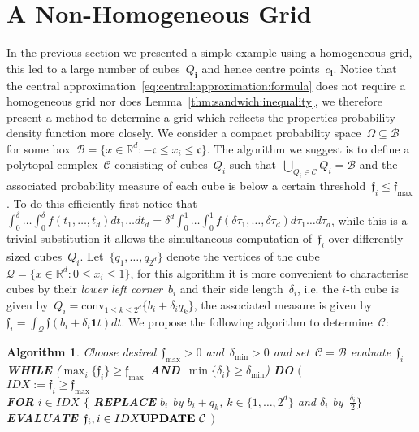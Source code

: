 \documentclass[letterpaper, 10pt, conference]{ieeeconf} %
\newtheorem{algo}[thm]{Algorithm}
\providecommand{\conv}{\text{conv}}
\providecommand{\bfa}[1]{\mathbf{#1}}
\begin{document}
\section{A Non-Homogeneous Grid}\label{sec:improved:grid}
%
%
%
\noindent In the previous section we presented a simple example using a homogeneous grid, this led to a large number of cubes~$Q_\bfa{i}$ and hence centre points~$c_\bfa{i}$.
%
Notice that the central approximation~\eqref{eq:central:approximation:formula} does not require a homogeneous grid nor does Lemma~\ref{thm:sandwich:inequality}, we therefore present a method to determine a grid which reflects the properties probability density function more closely.
%
We consider a compact probability space~$\Omega\subseteq\mathcal B$ for some box~$\mathcal B=\{x\in\mathbb R^d:-\mathfrak{c}\leq x_i\leq \mathfrak{c}\}$.
%
The algorithm we suggest is to define a polytopal complex~$\mathcal C$ consisting of cubes~$Q_i$ such that~$\bigcup_{Q_i\in\mathcal C}Q_i=\mathcal B$ and the associated probability measure of each cube is below a certain threshold~$\mathfrak{f}_i\leq\mathfrak{f}_{\max}$.
%
To do this efficiently first notice that~$\int_0^{\delta}\dots\int_0^\delta f(t_1,\dots,t_d)dt_1\dots dt_d = \delta^d\int_0^1\dots\int_0^1f(\delta\tau_1,\dots,\delta\tau_d)d\tau_1\dots d\tau_d$, while this is a trivial substitution it allows the simultaneous computation of~$\mathfrak{f}_i$ over differently sized cubes~$Q_i$.
%
Let~$\{q_1,\dots,q_{2^d}\}$ denote the vertices of the cube~$\mathcal Q=\{x\in\mathbb R^d: 0\leq x_i\leq 1\}$, for this algorithm it is more convenient to characterise cubes by their \emph{lower left corner}~$b_i$ and their side length~$\delta_i$, i.e. the $i$-th cube is given by~$Q_i=\conv_{1\leq k\leq2^d}\{b_i+\delta_i q_k\}$, the associated measure is given by~$\mathfrak{f}_i=\int_{\mathcal Q}\mathfrak{f}(b_i+\delta_i\bfa{1} t)dt$.
%
We propose the following algorithm to determine~$\mathcal C$:
%
\begin{algo}\label{algo:non:homo:cubes}
Choose desired~$\mathfrak{f}_{\max}>0$ and~$\delta_{\min}>0$ and set~$\mathcal C=\mathcal B$ evaluate~$\mathfrak{f}_i$\\
\textbf{WHILE} ($\max_i\{\mathfrak{f}_i\}\geq\mathfrak{f}_{\max}$~\textbf{AND}~$\min\{\delta_i\}\geq\delta_{\min}$) \textbf{DO} $\bigl($\\
$IDX := \mathfrak{f}_i\geq \mathfrak{f}_{\max}$\\
\textbf{FOR} $i\in IDX$ $\{$ \textbf{REPLACE} $b_i$ by $b_i+q_k$, $k\in\{1,\dots,2^d\}$ 
and $\delta_i$ by~$\frac{\delta_i}{2}\}$\\
\textbf{EVALUATE}~$\mathfrak f_i, i\in IDX\\
\textbf{UPDATE}~\mathcal C$
$\bigr)$
\end{algo}
\end{document}
